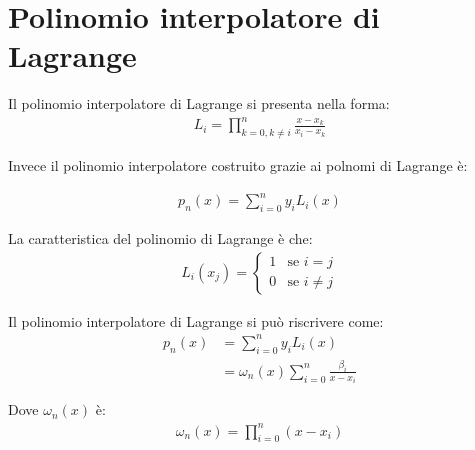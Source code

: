 \chapter{Polinomio interpolatore di Lagrange}

Il polinomio interpolatore di Lagrange si presenta nella forma:
\begin{align}
  L_i = \prod_{k=0, k\neq i}^n \frac{x - x_k}{x_i - x_k}
\end{align}

Invece il polinomio interpolatore costruito grazie ai polnomi di Lagrange è:

\begin{align}
  p_n(x) = \sum_{i=0}^n y_i L_i(x)
\end{align}

La caratteristica del polinomio di Lagrange è che:
\begin{align}
  L_i(x_j) = \begin{cases}
    1 & \text{se } i = j \\
    0 & \text{se } i \neq j
  \end{cases}
\end{align}

Il polinomio interpolatore di Lagrange si può riscrivere come:
\begin{align}
  p_n(x)  &= \sum_{i=0}^n y_i L_i(x) \\
          &= \omega_n(x) \sum_{i = 0}^n \frac{\beta_i}{x-x_i}
\end{align}

Dove $\omega_n(x)$ è:
\begin{align}
  \omega_n(x) = \prod_{i=0}^n (x-x_i)
\end{align}
